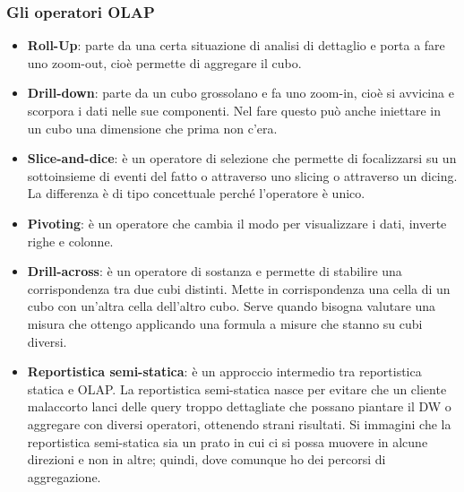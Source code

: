 \subsubsection{Gli operatori OLAP}
\begin{itemize}
	\item
	\textbf{Roll-Up}: parte da una certa situazione di analisi di dettaglio e  porta a fare uno zoom-out, cioè permette di aggregare il cubo. 
	\item 
	\textbf{Drill-down}: parte da un cubo grossolano e fa uno zoom-in, cioè si avvicina e scorpora i dati nelle sue componenti. Nel fare questo può anche iniettare in un cubo una dimensione che prima non c’era. 
	\item 
	\textbf{Slice-and-dice}: è un operatore di selezione che permette di focalizzarsi su un sottoinsieme di eventi del fatto o attraverso uno slicing o attraverso un dicing. La differenza è di tipo concettuale perché l’operatore è unico. 
	\item 
	\textbf{Pivoting}: è un operatore che cambia il modo per visualizzare i dati, inverte righe e colonne.
	\item 
	\textbf{Drill-across}: è un operatore di sostanza e permette di stabilire una corrispondenza tra due cubi distinti. Mette in corrispondenza una cella di un cubo con un’altra cella dell’altro cubo. Serve quando bisogna valutare una misura che ottengo applicando una formula a misure che stanno su cubi diversi. 
	\item 
	\textbf{Reportistica semi-statica}: è un approccio intermedio tra reportistica statica e OLAP. La reportistica semi-statica nasce per evitare che un cliente malaccorto lanci delle query troppo dettagliate che possano piantare il DW o aggregare con diversi operatori, ottenendo strani risultati. Si immagini che la reportistica semi-statica sia un prato in cui ci si possa muovere in alcune direzioni e non in altre; quindi, dove comunque ho dei percorsi di aggregazione.
\end{itemize}
